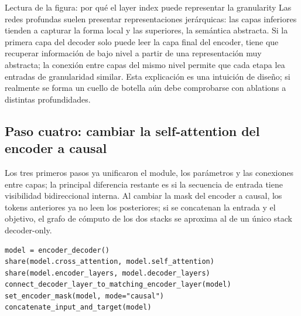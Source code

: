 

\begin{knowledgebox}{Lectura de la figura: por qué el layer index puede representar la granularity}
Las redes profundas suelen presentar representaciones jerárquicas: las capas inferiores tienden a capturar la forma local y las superiores, la semántica abstracta. Si la primera capa del decoder solo puede leer la capa final del encoder, tiene que recuperar información de bajo nivel a partir de una representación muy abstracta; la conexión entre capas del mismo nivel permite que cada etapa lea entradas de granularidad similar. Esta explicación es una intuición de diseño; si realmente se forma un cuello de botella aún debe comprobarse con ablations a distintas profundidades.
\end{knowledgebox}

\subsection{Paso cuatro: cambiar la self-attention del encoder a causal}

Los tres primeros pasos ya unificaron el module, los parámetros y las conexiones entre capas; la principal diferencia restante es si la secuencia de entrada tiene visibilidad bidireccional interna. Al cambiar la mask del encoder a causal, los tokens anteriores ya no leen los posteriores; si se concatenan la entrada y el objetivo, el grafo de cómputo de los dos stacks se aproxima al de un único stack decoder-only.



\begin{lstlisting}[caption={Pseudocódigo conceptual de la architecture transformation en cuatro pasos}]
model = encoder_decoder()
share(model.cross_attention, model.self_attention)
share(model.encoder_layers, model.decoder_layers)
connect_decoder_layer_to_matching_encoder_layer(model)
set_encoder_mask(model, mode="causal")
concatenate_input_and_target(model)
\end{lstlisting}

